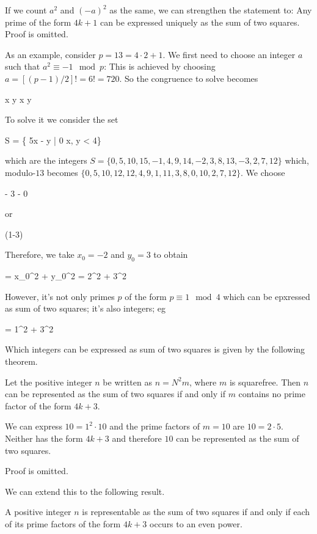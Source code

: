 If we count $a^2$ and $(-a)^2$ as the same, we can strengthen the statement to: Any prime of the form $4k+1$ can be expressed uniquely as the sum of two squares. Proof is omitted.

As an example, consider $p = 13 = 4 \cdot 2 + 1$. We first need to choose an integer $a$ such that $a^2 \equiv -1 \mod p$: This is achieved by choosing $a = [(p-1)/2]! = 6! = 720$. So the congruence to solve becomes

 x \equiv y   x \equiv y 
\eee

To solve it we consider the set

\bee
S = \{ 5x - y | 0 \leq x, y < 4\}
\eee

which are the integers $S = \{0, 5, 10, 15, -1, 4, 9, 14, -2, 3, 8, 13, -3, 2, 7, 12\}$ which, modulo-$13$ becomes $\{0, 5, 10, 12, 12, 4, 9, 1, 11, 3, 8, 0, 10, 2, 7, 12\}$. We choose

  - 3    - 0 
\eee

or

 (1-3)  
\eee

Therefore, we take $x_0 = -2$ and $y_0 = 3$ to obtain

 = x_0^2 + y_0^2 = 2^2 + 3^2
\eee


However, it's not only primes $p$ of the form $p \equiv 1 \mod 4$ which can be epxressed as sum of two squares; it's also integers; eg

 = 1^2 + 3^2
\eee

Which integers can be expressed as sum of two squares is given by the following theorem.

\begin{theorem}
Let the positive integer $n$ be written as $n = N^2 m$, where $m$ is squarefree. Then $n$ can be represented as the sum of two squares if and only if $m$ contains no prime factor of the form $4k + 3$.
\end{theorem}

We can express $10 = 1^2 \cdot 10$ and the prime factors of $m = 10$ are $10 = 2 \cdot 5$. Neither has the form $4k+3$ and therefore $10$ can be represented as the sum of two squares.

Proof is omitted.

We can extend this to the following result.

\begin{theorem}
A positive integer $n$ is representable as the sum of two squares if and only if each of its prime factors of the form $4k + 3$ occurs to an even power.
\end{theorem}

